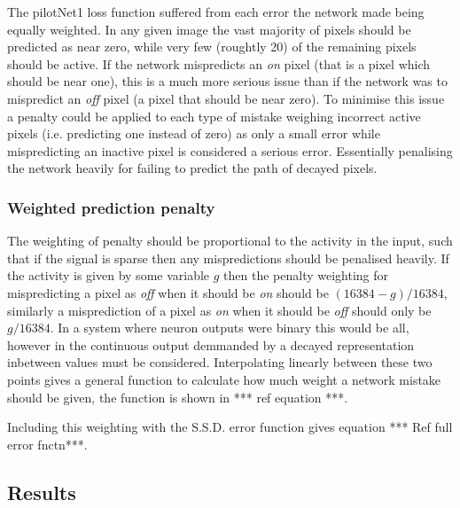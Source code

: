 The pilotNet1 loss function suffered from each error the network made being equally weighted.
In any given image the vast majority of pixels should be predicted as near zero, while very few (roughtly 20) of the remaining pixels should be active. 
If the network mispredicts an \textit{on} pixel (that is a pixel which should be near one), this is a much more serious issue than if the network was to mispredict an \textit{off} pixel (a pixel that should be near zero). 
To minimise this issue a penalty could be applied to each type of mistake weighing incorrect active pixels (i.e. predicting one instead of zero) as only a small error while mispredicting an inactive pixel is considered a serious error.
Essentially penalising the network heavily for failing to predict the path of decayed pixels. 

\subsubsection{Weighted prediction penalty}
The weighting of penalty should be proportional to the activity in the input, such that if the signal is sparse then any mispredictions should be penalised heavily. 
If the activity is given by some variable $g$ then the penalty weighting for mispredicting a pixel as \textit{off} when it should be \textit{on} should be $(16384 - g) / 16384$, similarly a misprediction of a pixel as \textit{on} when it should be \textit{off} should only be $g / 16384$. 
In a system where neuron outputs were binary this would be all, however in the continuous output demmanded by a decayed representation inbetween values must be considered.
Interpolating linearly between these two points gives a general function to calculate how much weight a network mistake should be given, the function is shown in *** ref equation ***.


Including this weighting with the S.S.D. error function gives equation *** Ref full error fnctn***.


\subsection{Results} 


